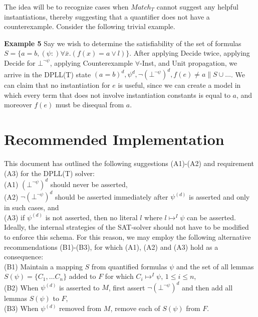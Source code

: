 \documentclass{llncs}
\begin{document}
The idea will be to recognize cases when $Match_T$ cannot suggest any helpful instantiations, thereby suggesting that a quantifier does not have a counterexample.
Consider the following trivial example.

{\bf Example 5}
Say we wish to determine the satisfiability of the set of formulas $S = \{ a = b, (\psi :) \forall \bar{x}. (f( x ) = a \vee l) \}$.
After applying Decide twice, applying Decide for $\bot^{\neg \psi}$, applying Counterexample $\forall$-Inst, and Unit propagation, we arrive in the DPLL(T) state $(a=b)^d, \psi^d, \neg ( \bot^{\neg \psi} )^d, f( e ) \neq a \parallel S \cup \ldots$.
We can claim that no instantiation for $e$ is useful, since we can create a model in which every term that does not involve instantiation constants is equal to $a$, and moreover $f(e)$ must be disequal from $a$.


\section{Recommended Implementation}
\label{sec:implementation}

This document has outlined the following suggestions (A1)-(A2) and requirement (A3) for the DPLL(T) solver: \\

\noindent (A1) $(\bot^{\neg \psi})^d$ should never be asserted, \\
(A2) $\neg (\bot^{\neg \psi})^d$ should be asserted immediately after $\psi^{(d)}$ is asserted and only in such cases, and \\
(A3) if $\psi^{(d)}$ is not asserted, then no literal $l$ where $l \mapsto^I \psi$ can be asserted. \\

Ideally, the internal strategies of the SAT-solver should not have to be modified to enforce this schema.
For this reason, we may employ the following alternative recommendations (B1)-(B3), for which (A1), (A2) and (A3) hold as a consequence: \\

\noindent (B1) Maintain a mapping $S$ from quantified formulas $\psi$ and the set of all lemmas $S(\psi) = \{ C_1, \ldots C_n \}$ added to $F$ for which $C_i \mapsto^I \psi$, $1 \leq i \leq n$, \\
(B2) When $\psi^{(d)}$ is asserted to $M$, first assert $\neg (\bot^{\neg \psi})^d$ and then add all lemmas $S(\psi)$ to $F$, \\
(B3) When $\psi^{(d)}$ removed from $M$, remove each of $S(\psi)$ from $F$. \\
\end{document}
